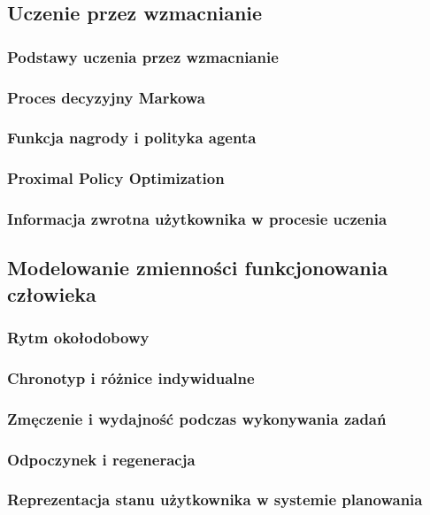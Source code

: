 \subsection{Uczenie przez wzmacnianie}

    \subsubsection{Podstawy uczenia przez wzmacnianie}

    \subsubsection{Proces decyzyjny Markowa}

    \subsubsection{Funkcja nagrody i polityka agenta}

    \subsubsection{Proximal Policy Optimization}

    \subsubsection{Informacja zwrotna użytkownika w procesie uczenia}


\subsection{Modelowanie zmienności funkcjonowania człowieka}

    \subsubsection{Rytm okołodobowy}

    \subsubsection{Chronotyp i różnice indywidualne}

    \subsubsection{Zmęczenie i wydajność podczas wykonywania zadań}

    \subsubsection{Odpoczynek i regeneracja}

    \subsubsection{Reprezentacja stanu użytkownika w systemie planowania}
